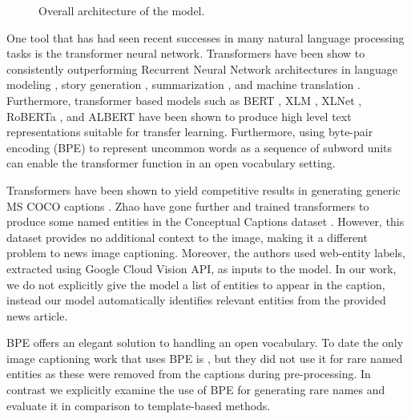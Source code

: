 
\begin{figure*}[t]
    \begin{center}
    \fbox{\rule{0pt}{2in} \rule{.9\linewidth}{0pt}}
    \end{center}
       \caption{Overall architecture of the model.}
    \label{fig:short}
 \end{figure*}

One tool that has had seen recent successes in many natural language processing
tasks is the transformer neural network.
Transformers have been show to consistently
outperforming Recurrent Neural Network architectures in language modeling
\cite{Radford2019LanguageMA},
story generation \cite{Fan2018HierarchicalNS}, summarization
\cite{Subramanian2019OnEA}, and machine translation \cite{Bojar2018Findings}.
Furthermore, transformer based models such as BERT \cite{Devlin2019BERT}, XLM
\cite{Lample2019CrosslingualLM}, XLNet \cite{Yang2019XLNetGA}, RoBERTa
\cite{Liu2019RoBERTaAR}, and ALBERT \cite{Lan2019ALBERT} have been shown to
produce high level text representations suitable for transfer learning.
Furthermore, using byte-pair
encoding (BPE) \cite{Sennrich2015NeuralMT} to represent uncommon words as a
sequence of subword units can enable the transformer function in an open
vocabulary setting.

Transformers have been shown
to yield competitive results in generating generic MS COCO captions
\cite{Zhu2018CaptioningTW, Li2019Boosted}. Zhao \etal
\cite{Zhao2019InformativeIC} have gone further and trained transformers to
produce some named entities in the Conceptual Captions dataset
\cite{Sharma2018ConceptualCA}. However, this dataset provides no additional
context to the image, making it a different problem to news image captioning.
Moreover, the authors used web-entity labels,
extracted using Google Cloud Vision API, as inputs to the model. In our work,
we do not explicitly give the model a list of
entities to appear in the caption, instead our model automatically identifies
relevant entities from the provided news article.

BPE offers an elegant solution to handling an open vocabulary. To date the only
image captioning work that uses BPE is \cite{Sharma2018ConceptualCA}, but they
did not use it for rare named entities as these were removed from
the captions during pre-processing. In contrast we explicitly examine the use
of BPE for generating rare names and evaluate it in comparison to
template-based methods.

